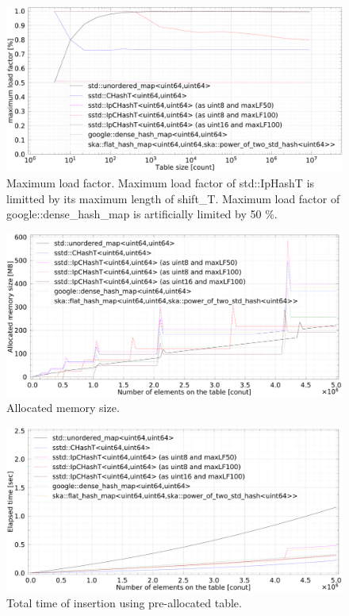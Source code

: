 \begin{figure}[h]
  \includegraphics[scale=0.24]{./fig_bench/maxLoadFactor_med.pdf}
  \caption{
    Maximum load factor. Maximum load factor of std::IpHashT is limitted by its maximum length of shift\_T.
    Maximum load factor of google::dense\_hash\_map is artificially limited by 50 \%.
  }
  \label{fig_bench_LF}
\end{figure}

\begin{figure}[h]
  \hspace{-1mm}
  \includegraphics[scale=0.24]{./fig_bench/usedMemory.pdf}
  \caption{ Allocated memory size. }
  \label{fig_bench_memory}
\end{figure}

\begin{figure}[h]
  \includegraphics[scale=0.24]{./fig_bench/insert_et_preAlloc_med.pdf}
  \caption{ Total time of insertion using pre-allocated table. }
  \label{fig_bench_insert_preAlloc}
\end{figure}

